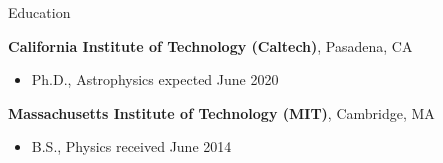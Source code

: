 \documentclass{resume} %
\begin{document}

\begin{rSection}{Education}

{\bf California Institute of Technology (Caltech)}, Pasadena, CA
\begin{itemize}
\item Ph.D., Astrophysics \hfill {expected June 2020} 
\end{itemize}

{\bf Massachusetts Institute of Technology (MIT)}, Cambridge, MA
\begin{itemize}
\item B.S., Physics \hfill {received June 2014} 
\end{itemize}

\end{rSection}

\end{document}
